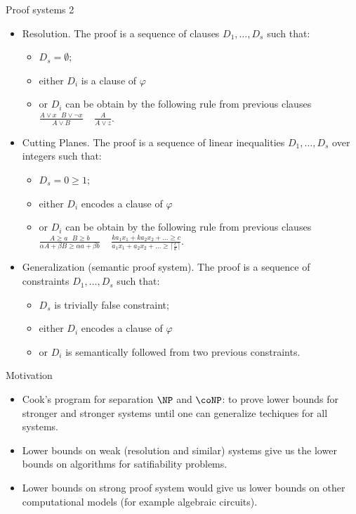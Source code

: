 \begin{frame}{Proof systems 2}
    \begin{itemize}
        \item Resolution. The proof is a sequence of clauses $D_1, \dots, D_s$ such that:
            \begin{itemize}
                \item $D_s = \emptyset$;
                \item either $D_i$ is a clause of $\varphi$
                \item or $D_i$ can be obtain by the following rule from previous clauses $\frac{A \lor x ~~~ B \lor \neg x}{A
                    \lor B} ~~~~~ \frac{A}{A \lor z}$.
            \end{itemize}
        \pause
        \item Cutting Planes. The proof is a sequence of linear inequalities $D_1, \dots, D_s$ over integers such that:
            \begin{itemize}
                \item $D_s = 0 \ge 1$;
                \item either $D_i$ encodes a clause of $\varphi$
                \item or $D_i$ can be obtain by the following rule from previous clauses $\frac{A \ge a ~~~ B \ge b}{\alpha A
                    + \beta B \ge \alpha a + \beta b} ~~~~~ \frac{ka_1 x_1 + ka_2 x_2 + \dots \ge c}{a_1 x_1 + a_2 x_2 +
                    \dots \ge \lceil \frac{c}{k} \rceil}$.
            \end{itemize}
        \pause
        \item Generalization (semantic proof system). The proof is a sequence of constraints $D_1, \dots, D_s$ such that:
            \begin{itemize}
                \item $D_s$ is trivially false constraint;
                \item either $D_i$ encodes a clause of $\varphi$
                \item or $D_i$ is semantically followed from two previous constraints.
            \end{itemize}
    \end{itemize}
\end{frame}


\begin{frame}{Motivation}
    \begin{itemize}
        \item Cook's program for separation $\NP$ and $\coNP$: to prove lower bounds for {\color{blue}
            stronger and stronger} systems until one can generalize techiques for all systems.
        \pause
        \item Lower bounds on {\color{blue} weak} (resolution and similar) systems give us the lower
            bounds on algorithms for satifiability problems.
        \pause
        \item Lower bounds on {\color{blue} strong} proof system would give us lower bounds on other
            computational models (for example algebraic circuits).
    \end{itemize}
\end{frame}


